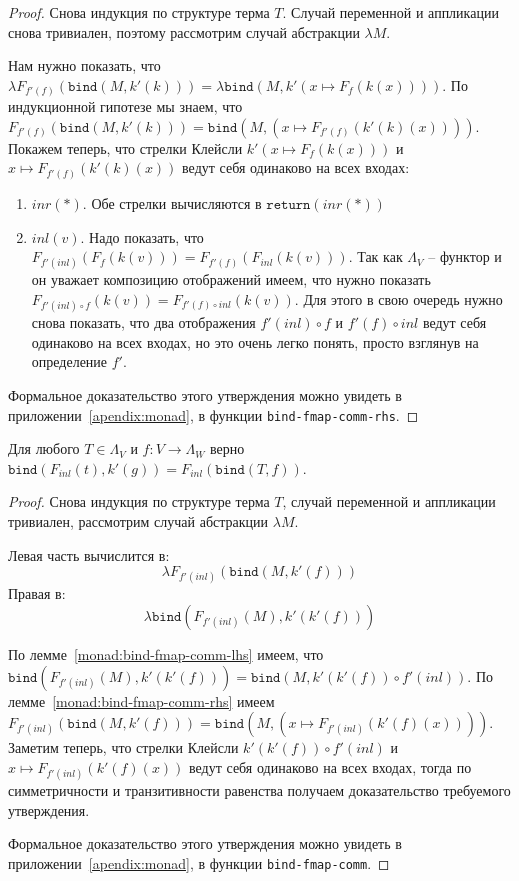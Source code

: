 \begin{proof}
  Снова индукция по структуре терма $T$. Случай переменной и аппликации снова тривиален, поэтому рассмотрим случай абстракции $\lambda M$.

  Нам нужно показать, что $\lambda F_{f'(f)}(\texttt{bind}(M, k'(k))) = \lambda \texttt{bind}(M, k'(x \mapsto F_{f}(k(x))))$. По индукционной гипотезе мы знаем, что $F_{f'(f)}(\texttt{bind}(M, k'(k))) = \texttt{bind}(M, (x \mapsto F_{f'(f)}(k'(k)(x))))$. Покажем теперь, что стрелки Клейсли $ k'(x \mapsto F_{f}(k(x))) $ и $ x \mapsto F_{f'(f)}(k'(k)(x)) $ ведут себя одинаково на всех входах:

  \begin{enumerate}
    \item $inr(*)$. Обе стрелки вычисляются в $\texttt{return}(inr(*))$
    \item $inl(v)$. Надо показать, что $F_{f'(inl)}(F_{f}(k(v))) = F_{f'(f)}(F_{inl}(k(v)))$. Так как $\Lambda_{V}$ -- функтор и он уважает композицию отображений имеем, что нужно показать $F_{f'(inl) \circ f}(k(v)) = F_{f'(f) \circ inl}(k(v))$. Для этого в свою очередь нужно снова показать, что два отображения $f'(inl) \circ f$ и $f'(f) \circ inl$ ведут себя одинаково на всех входах, но это очень легко понять, просто взглянув на определение $f'$.
  \end{enumerate}

  Формальное доказательство этого утверждения можно увидеть в приложении~\ref{apendix:monad}, в функции \texttt{bind-fmap-comm-rhs}.
\end{proof}

\begin{lemma}
  \label{monad:bind-fmap-comm}
  Для любого $T \in \Lambda_{V}$ и $f : V \to \Lambda_{W}$ верно $\texttt{bind}(F_{inl}(t), k'(g)) = F_{inl}(\texttt{bind}(T, f))$.
\end{lemma}

\begin{proof}
  Снова индукция по структуре терма $T$, случай переменной и аппликации тривиален, рассмотрим случай абстракции $\lambda M$.

  Левая часть вычислится в:
  $$ \lambda F_{f'(inl)}(\texttt{bind}(M, k'(f))) $$
  Правая в:
  $$ \lambda \texttt{bind}(F_{f'(inl)}(M), k'(k'(f))) $$

  По лемме~\ref{monad:bind-fmap-comm-lhs} имеем, что $\texttt{bind}(F_{f'(inl)}(M), k'(k'(f))) = \texttt{bind}(M, k'(k'(f)) \circ f'(inl))$. По лемме~\ref{monad:bind-fmap-comm-rhs} имеем $F_{f'(inl)}(\texttt{bind}(M, k'(f))) = \texttt{bind}(M, (x \mapsto F_{f'(inl)}(k'(f)(x))))$. Заметим теперь, что стрелки Клейсли $k'(k'(f)) \circ f'(inl)$ и $x \mapsto F_{f'(inl)}(k'(f)(x))$ ведут себя одинаково на всех входах, тогда по симметричности и транзитивности равенства получаем доказательство требуемого утверждения.

  Формальное доказательство этого утверждения можно увидеть в приложении~\ref{apendix:monad}, в функции \texttt{bind-fmap-comm}.
\end{proof}

